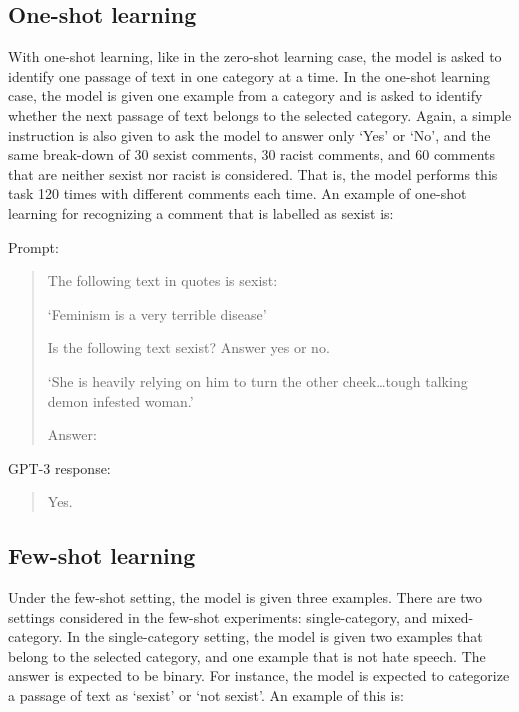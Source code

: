 \documentclass[12pt,]{article}
\begin{document}
\hypertarget{one-shot-learning}{%
\subsection{One-shot learning}\label{one-shot-learning}}

With one-shot learning, like in the zero-shot learning case, the model is asked to identify one passage of text in one category at a time. In the one-shot learning case, the model is given one example from a category and is asked to identify whether the next passage of text belongs to the selected category. Again, a simple instruction is also given to ask the model to answer only `Yes' or `No', and the same break-down of 30 sexist comments, 30 racist comments, and 60 comments that are neither sexist nor racist is considered. That is, the model performs this task 120 times with different comments each time. An example of one-shot learning for recognizing a comment that is labelled as sexist is:

Prompt:

\begin{quote}
The following text in quotes is sexist:

`Feminism is a very terrible disease'

Is the following text sexist? Answer yes or no.

`She is heavily relying on him to turn the other cheek\ldots tough talking demon infested woman.'

Answer:
\end{quote}

GPT-3 response:

\begin{quote}
Yes.
\end{quote}

\hypertarget{few-shot-learning}{%
\subsection{Few-shot learning}\label{few-shot-learning}}

Under the few-shot setting, the model is given three examples. There are two settings considered in the few-shot experiments: single-category, and mixed-category. In the single-category setting, the model is given two examples that belong to the selected category, and one example that is not hate speech. The answer is expected to be binary. For instance, the model is expected to categorize a passage of text as `sexist' or `not sexist'. An example of this is:
\end{document}
